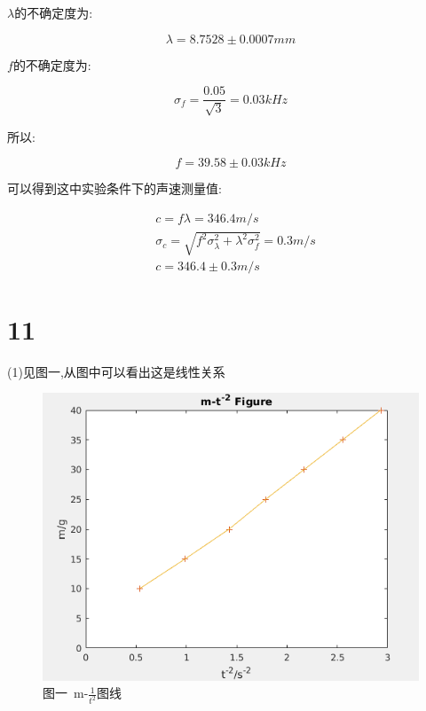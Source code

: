 \documentclass[a4paper,10pt,notitlepage]{report}
\begin{document}
	$\lambda$的不确定度为:
	
\begin{equation}
	\lambda=8.7528\pm0.0007 mm
\end{equation}

	$f$的不确定度为:

\begin{equation}
	\sigma_f=\frac{0.05}{\sqrt{3}}=0.03 kHz
\end{equation}

	所以:

\begin{equation}
	f=39.58\pm0.03 kHz
\end{equation}

	可以得到这中实验条件下的声速测量值:

\begin{align}
	&c=f\lambda=346.4 m/s\\
	&\sigma_c=\sqrt{f^2\sigma_{\lambda}^2+\lambda^2\sigma_f^2}=0.3m/s\\
	&c=346.4\pm0.3 m/s
\end{align}

\section*{11}

	(1)见图一,从图中可以看出这是线性关系 \\
	
\begin{figure}
\centering
	\includegraphics[scale=0.5]{Q11.png}
	\caption{图一\ m-$\frac{1}{t^2}$图线}
\end{figure}
\end{document}

